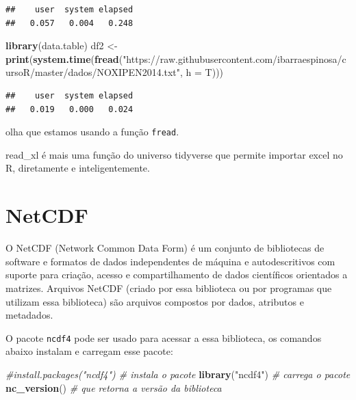 \documentclass[]{book}
\newenvironment{Shaded}{\begin{snugshade}}{\end{snugshade}}
\newcommand{\KeywordTok}[1]{\textcolor[rgb]{0.13,0.29,0.53}{\textbf{#1}}}
\newcommand{\DataTypeTok}[1]{\textcolor[rgb]{0.13,0.29,0.53}{#1}}
\newcommand{\StringTok}[1]{\textcolor[rgb]{0.31,0.60,0.02}{#1}}
\newcommand{\CommentTok}[1]{\textcolor[rgb]{0.56,0.35,0.01}{\textit{#1}}}
\newcommand{\NormalTok}[1]{#1}
\begin{document}
\begin{verbatim}
##    user  system elapsed 
##   0.057   0.004   0.248
\end{verbatim}

\begin{Shaded}
\begin{Highlighting}[]
\KeywordTok{library}\NormalTok{(data.table)}
\NormalTok{df2 <-}\StringTok{ }\KeywordTok{print}\NormalTok{(}\KeywordTok{system.time}\NormalTok{(}\KeywordTok{fread}\NormalTok{(}\StringTok{"https://raw.githubusercontent.com/ibarraespinosa/cursoR/master/dados/NOXIPEN2014.txt"}\NormalTok{, }\DataTypeTok{h =}\NormalTok{ T)))}
\end{Highlighting}
\end{Shaded}

\begin{verbatim}
##    user  system elapsed 
##   0.019   0.000   0.024
\end{verbatim}

olha que estamos usando a função \texttt{fread}.

read\_xl é mais uma função do universo tidyverse que permite importar
excel no R, diretamente e inteligentemente.

\section{NetCDF}\label{netcdf}

O NetCDF (Network Common Data Form) é um conjunto de bibliotecas de
software e formatos de dados independentes de máquina e autodescritivos
com suporte para criação, acesso e compartilhamento de dados científicos
orientados a matrizes. Arquivos NetCDF (criado por essa biblioteca ou
por programas que utilizam essa biblioteca) são arquivos compostos por
dados, atributos e metadados.

O pacote \texttt{ncdf4} pode ser usado para acessar a essa biblioteca,
os comandos abaixo instalam e carregam esse pacote:

\begin{Shaded}
\begin{Highlighting}[]
\CommentTok{#install.packages("ncdf4") # instala o pacote}
\KeywordTok{library}\NormalTok{(}\StringTok{"ncdf4"}\NormalTok{)          }\CommentTok{# carrega o pacote}
\KeywordTok{nc_version}\NormalTok{()              }\CommentTok{# que retorna a versão da biblioteca}
\end{Highlighting}
\end{Shaded}
\end{document}
